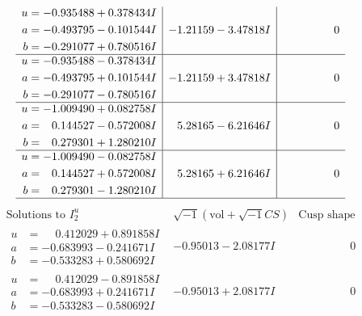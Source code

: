 \documentclass[1p]{elsarticle_modified}
\theoremstyle{definition}
\newcommand{\I}{\sqrt{-1}}
\begin{document}
$$\begin{array}{c|c|c}
\begin{aligned}
u &= -0.935488 + 0.378434 I \\
a &= -0.493795 - 0.101544 I \\
b &= -0.291077 + 0.780516 I\end{aligned}
 & -1.21159 - 3.47818 I & \phantom{-0.000000 } 0 \\ \hline\begin{aligned}
u &= -0.935488 - 0.378434 I \\
a &= -0.493795 + 0.101544 I \\
b &= -0.291077 - 0.780516 I\end{aligned}
 & -1.21159 + 3.47818 I & \phantom{-0.000000 } 0 \\ \hline\begin{aligned}
u &= -1.009490 + 0.082758 I \\
a &= \phantom{-}0.144527 - 0.572008 I \\
b &= \phantom{-}0.279301 + 1.280210 I\end{aligned}
 & \phantom{-}5.28165 - 6.21646 I & \phantom{-0.000000 } 0 \\ \hline\begin{aligned}
u &= -1.009490 - 0.082758 I \\
a &= \phantom{-}0.144527 + 0.572008 I \\
b &= \phantom{-}0.279301 - 1.280210 I\end{aligned}
 & \phantom{-}5.28165 + 6.21646 I & \phantom{-0.000000 } 0\\
 \hline 
 \end{array}$$\newpage$$\begin{array}{c|c|c}  
\text{Solutions to }I^u_{2}& \I (\text{vol} + \sqrt{-1}CS) & \text{Cusp shape}\\
 \hline 
\begin{aligned}
u &= \phantom{-}0.412029 + 0.891858 I \\
a &= -0.683993 - 0.241671 I \\
b &= -0.533283 + 0.580692 I\end{aligned}
 & -0.95013 - 2.08177 I & \phantom{-0.000000 } 0 \\ \hline\begin{aligned}
u &= \phantom{-}0.412029 - 0.891858 I \\
a &= -0.683993 + 0.241671 I \\
b &= -0.533283 - 0.580692 I\end{aligned}
 & -0.95013 + 2.08177 I & \phantom{-0.000000 } 0 \\ \hline\begin{aligned}

\end{aligned}
\end{array}$$
\end{document}
